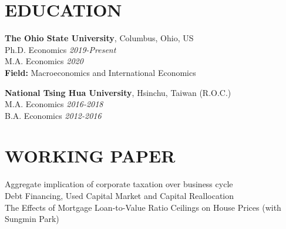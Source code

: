 \documentclass[10pt]{res} %
\begin{document}
\begin{resume}






\section{EDUCATION}

\vspace{8pt} %

{\bf The Ohio State University}, Columbus, Ohio, US \\
Ph.D. Economics \hfill  \textit{2019-Present} \\
M.A. Economics \hfill  \textit{2020} \\
\textbf{Field: } Macroeconomics and International Economics

{\bf National Tsing Hua University}, Hsinchu, Taiwan (R.O.C.) \\
M.A. Economics \hfill  \textit{2016-2018} \\
B.A. Economics \hfill  \textit{2012-2016} \\

\vspace{-10pt}

\section{WORKING PAPER}
\label{sec:research_experience}
Aggregate implication of corporate taxation over business cycle \\
Debt Financing, Used Capital Market and Capital Reallocation \\
The Effects of Mortgage Loan-to-Value Ratio Ceilings on House Prices (with Sungmin Park) \\


\end{resume}
\end{document}
